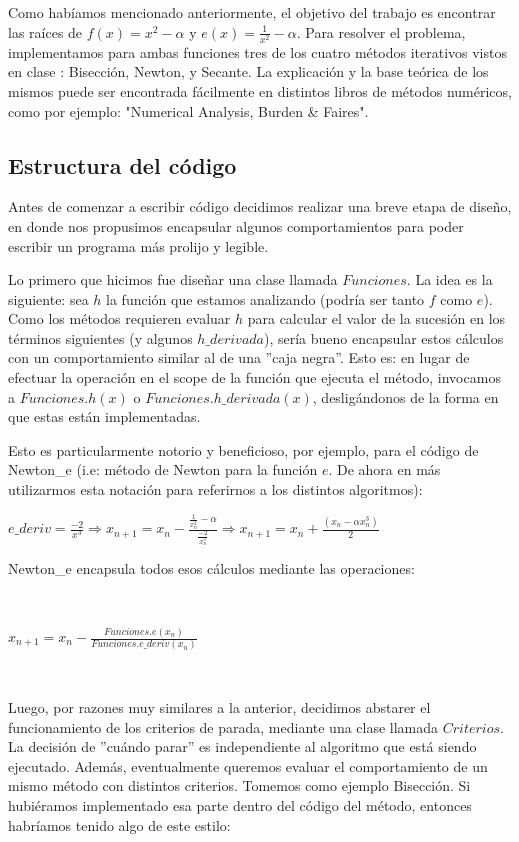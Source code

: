 Como habíamos mencionado anteriormente, el objetivo del trabajo es encontrar las raíces de $f(x)=x^{2} - \alpha$ y $e(x) = \frac{1}{x^{2}} - \alpha$.
Para resolver el problema, implementamos para ambas funciones tres de los cuatro métodos iterativos vistos en clase : Bisección, Newton, y Secante.
La explicación y la base teórica de los mismos puede ser encontrada fácilmente en distintos libros de métodos numéricos, como
por ejemplo: "Numerical Analysis, Burden \& Faires". 

\subsection{Estructura del código}

Antes de comenzar a escribir código decidimos realizar una breve etapa de diseño, en donde nos propusimos encapsular algunos comportamientos para poder escribir un programa
más prolijo y legible.

Lo primero que hicimos fue diseñar una clase llamada $Funciones$. La idea es la siguiente: sea $h$ la función que estamos analizando (podría ser tanto $f$ como $e$).
Como los métodos requieren evaluar $h$ para calcular el valor de la sucesión en los términos siguientes (y algunos $h\_derivada$), sería bueno encapsular estos cálculos
con un comportamiento similar al de una ''caja negra''. Esto es: en lugar de efectuar la operación en el scope de la función que ejecuta el método,
invocamos a $Funciones.h(x)$ o $Funciones.h\_derivada(x)$, desligándonos de la forma en que estas están implementadas.

Esto es particularmente notorio y beneficioso, por ejemplo, para el código de Newton\_e (i.e: método de Newton para la función $e$. De ahora en más utilizarmos esta notación
para referirnos a los distintos algoritmos):

$\displaystyle e\_deriv = \frac{-2}{x^{3}} \Rightarrow x_{n+1} = x_{n} - \frac{\frac{1}{x_{n}^2}-\alpha}{\frac{-2}{x_{n}^{3}}} \Rightarrow 
x_{n+1} = x_{n} + \frac{(x_{n} - \alpha x_{n}^{3})}{2} $ 

Newton\_e encapsula todos esos cálculos mediante las operaciones:

~

$x_{n+1} = x_{n} - \frac{Funciones.e(x_{n})}{Funciones.e\_deriv(x_{n})}$

~

Luego, por razones muy similares a la anterior, decidimos abstarer el funcionamiento de los criterios de parada, mediante una clase llamada $Criterios$. La decisión de
''cuándo parar'' es independiente al algoritmo que está siendo ejecutado. Además, eventualmente queremos evaluar el comportamiento de un mismo método con distintos 
criterios. Tomemos como ejemplo Bisección. Si hubiéramos implementado esa parte dentro del código del método, entonces habríamos tenido algo de este estilo:

